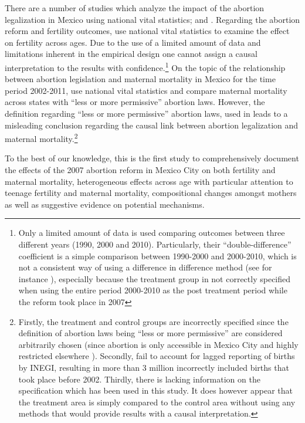 \documentclass[a4paper, 11pt]{article}
\begin{document}
\begin{spacing}{2}
There are a number of studies which analyze the impact of the abortion legalization in Mexico using national vital statistics; \cite{Gutierrez2015} and \cite{Koch01022015}. Regarding the abortion reform and fertility outcomes, \cite{Gutierrez2015} use national vital statistics to examine the effect on fertility across ages. Due to the use of a limited amount of data and limitations inherent in the empirical design one cannot assign a causal interpretation to the results with confidence.\footnote{Only a limited amount of data is used comparing outcomes between three different years (1990, 2000 and 2010). Particularly, their ``double-difference'' coefficient is a simple comparison between 1990-2000 and 2000-2010, which is not a consistent way of using a difference in difference method (see for instance \cite{wooldridge2010econometric}), especially because the treatment group in not correctly specified when using the entire period 2000-2010 as the post treatment period while the reform took place in 2007} On the topic of the relationship between abortion legislation and maternal mortality in Mexico for the time period 2002-2011, \cite{Koch01022015} use national vital statistics and compare maternal mortality across states with ``less or more permissive'' abortion laws. However, the definition regarding ``less or more permissive'' abortion laws, used in  \cite{Koch01022015} leads to a misleading conclusion regarding the causal link between abortion legalization and maternal mortality.\footnote{Firstly, the treatment and control groups are incorrectly specified since the definition of abortion laws being “less or more permissive” are considered arbitrarily chosen (since abortion is only accessible in Mexico City and highly restricted elsewhere \citep{Kulczycki2011}). Secondly, \cite{Koch01022015} fail to account for lagged reporting of births by INEGI, resulting in more than 3 million incorrectly included births that took place before 2002. Thirdly, there is lacking information on the specification which has been used in this study. It does however appear that the treatment area is simply compared to the control area without using any methods that would provide results with a causal interpretation.} 

To the best of our knowledge, this is the first study to comprehensively document the effects of the 2007 abortion reform in Mexico City on both fertility and maternal mortality, heterogeneous effects across age with particular attention to teenage fertility and maternal mortality, compositional changes amongst mothers as well as suggestive evidence on potential mechanisms.          



\end{spacing}
\end{document}
